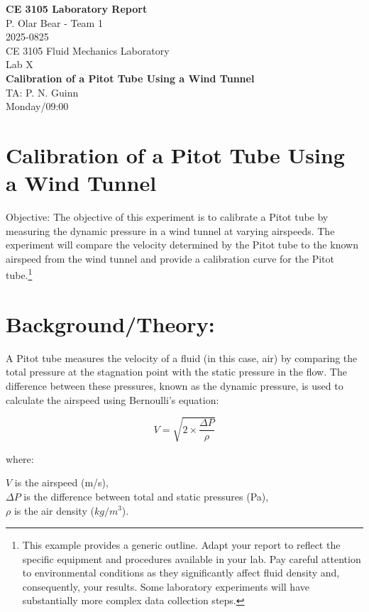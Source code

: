 \documentclass[12pt]{article}
\begin{document}
\begin{centering}
\textbf{CE 3105 Laboratory Report}\\
P. Olar Bear - Team 1\\
2025-0825\\
CE 3105 Fluid Mechanics Laboratory\\
Lab X\\
\textbf{Calibration of a Pitot Tube Using a Wind Tunnel}\\
TA: P. N. Guinn\\
Monday/09:00\\
\end{centering}
\clearpage

\section{Calibration of a Pitot Tube Using a Wind Tunnel}

Objective: The objective of this experiment is to calibrate a Pitot tube by measuring the dynamic pressure in a wind tunnel at varying airspeeds. The experiment will compare the velocity determined by the Pitot tube to the known airspeed from the wind tunnel and provide a calibration curve for the Pitot tube.\footnote{This example provides a generic outline. Adapt your report to reflect the specific equipment and procedures available in your lab.
Pay careful attention to environmental conditions as they significantly affect fluid density and, consequently, your results. Some laboratory experiments will have substantially more complex data collection steps.} \\

\section{Background/Theory:}
A Pitot tube measures the velocity of a fluid (in this case, air) by comparing the total pressure at the stagnation point with the static pressure in the flow. The difference between these pressures, known as the dynamic pressure, is used to calculate the airspeed using Bernoulli’s equation:

\begin{equation}
V=\sqrt{2 \times \frac{\Delta P}{\rho}}
\end{equation}

where:

    $V$ is the airspeed (m/s),\\
    $\Delta P$ is the difference between total and static pressures (Pa),\\
    $\rho$ is the air density ($kg/m^3$).\\
\end{document}
